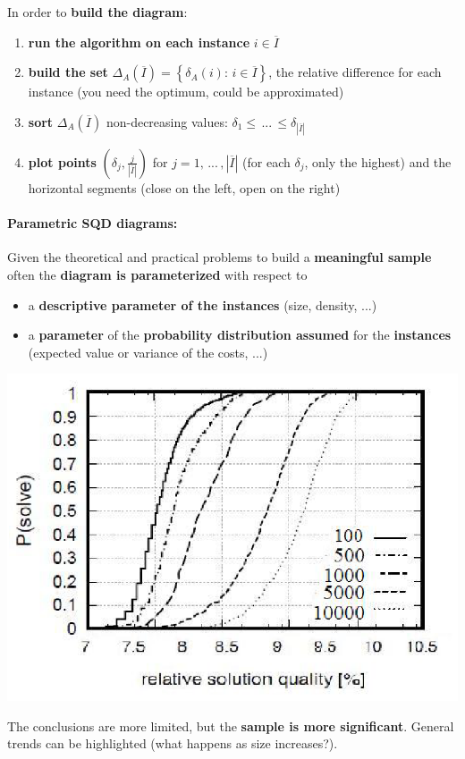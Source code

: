 In order to \textbf{build the diagram}:
\begin{enumerate}
	\item \textbf{run the algorithm on each instance} $i \in \overline{I}$
	\item \textbf{build the set} $\Delta_A (\overline{I}) = \left\{\delta_A (i): \, i \in \overline{I} \right\}$, the relative difference for each instance (you need the optimum, could be approximated)
	\item \textbf{sort} $\Delta_A (\overline{I})$ non-decreasing values: $\delta_1 \leq \, ... \, \leq \delta_{|\overline{I}|}$
	\item \textbf{plot points} $\left(\delta_j, \frac{j}{|\overline{I}|}\right)$ for $j = 1, \, ... \, , |\overline{I}|$ (for each $\delta_j$, only the highest) and the horizontal segments (close on the left, open on the right)
\end{enumerate}

\newpage

\paragraph{Parametric SQD diagrams:} Given the theoretical and practical problems to build a \textbf{meaningful sample} often the \textbf{diagram is parameterized} with respect to
\begin{itemize}
	\item a \textbf{descriptive parameter of the instances} (size, density, ...)
	\item a \textbf{parameter} of the \textbf{probability distribution assumed} for the \textbf{instances} (expected value or variance of the costs, ...)
\end{itemize}
\begin{center}
	\includegraphics[width=0.7\columnwidth]{img/SQD3}
\end{center}
The conclusions are more limited, but the \textbf{sample is more significant}. General trends can be highlighted (what happens as size increases?).\\

